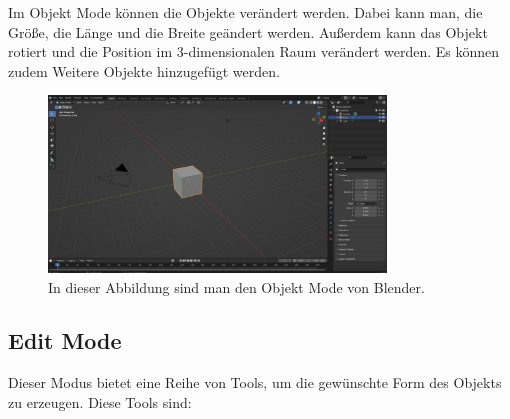 Im Objekt Mode können die Objekte verändert werden.
Dabei kann man, die Größe, die Länge und die Breite geändert werden.
Außerdem kann das Objekt rotiert und die Position im 3-dimensionalen Raum verändert werden. 
Es können zudem Weitere Objekte hinzugefügt werden.
\begin{figure}[H]
    \centering
    \includegraphics[width=0.8\textwidth]{chapters/13/images/3D-Viewport.png}
    \caption{In dieser Abbildung sind man den Objekt Mode von Blender.}
    \label{UST-8}
\end{figure}


\subsection{Edit Mode}
Dieser Modus bietet eine Reihe von Tools, um die gewünschte Form des Objekts zu erzeugen.
Diese Tools sind:


